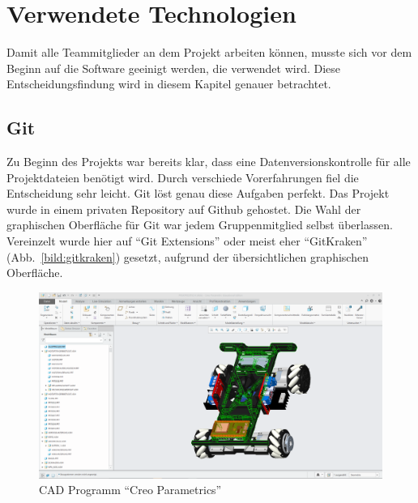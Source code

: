 \section{Verwendete Technologien}
Damit alle Teammitglieder an dem Projekt arbeiten können, musste sich vor dem Beginn auf die Software geeinigt werden, die verwendet wird. 
Diese Entscheidungsfindung wird in diesem Kapitel genauer betrachtet.

\subsection{Git}
Zu Beginn des Projekts war bereits klar, dass eine Datenversionskontrolle für alle Projektdateien benötigt wird.
Durch verschiede Vorerfahrungen fiel die Entscheidung sehr leicht. Git löst genau diese Aufgaben perfekt. Das Projekt wurde in einem privaten Repository auf Github gehostet. 
Die Wahl der graphischen Oberfläche für Git war jedem Gruppenmitglied selbst überlassen.
Vereinzelt wurde hier auf ``Git Extensions'' oder meist eher ``GitKraken'' (Abb.~\ref{bild:gitkraken}) gesetzt, aufgrund der übersichtlichen graphischen Oberfläche.

\begin{figure}[!ht]
	\centering
	\includegraphics[width=\textwidth]{bilder/CreoParametrics.png}
	\caption{CAD Programm ``Creo Parametrics''}
	\label{bild:creo}
\end{figure}

